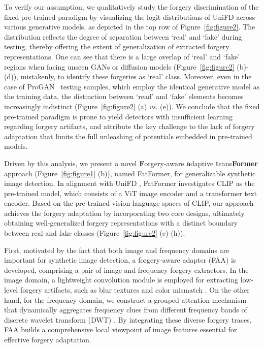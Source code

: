 \documentclass[10pt,twocolumn,letterpaper]{article}
\begin{document}
To verify our assumption, we qualitatively study the forgery discrimination of the fixed pre-trained paradigm by visualizing the logit distributions of UniFD \cite{ojha2023towards} across various generative models, as depicted in the top row of Figure~\ref{fig:figure2}.
The distribution reflects the degree of separation between `real' and `fake' during testing, thereby offering the extent of generalization of extracted forgery representations. 
One can see that there is a large overlap of `real' and `fake' regions when facing unseen GANs or diffusion models (Figure~\ref{fig:figure2} (b)-(d)), mistakenly, to identify these forgeries as `real' class. Moreover, even in the case of ProGAN~\cite{karras2018progressive} testing samples, which employ the identical generative model as the training data, the distinction between `read' and `fake' elements becomes increasingly indistinct (Figure~\ref{fig:figure2} (a) {\em vs.} (e)). 
We conclude that the fixed pre-trained paradigm is prone to yield detectors with insufficient learning regarding forgery artifacts, and attribute the key challenge to the lack of forgery adaptation that limits the full unleashing of potentials embedded in pre-trained models.

Driven by this analysis, we present a novel \textbf{F}orgery-aware \textbf{a}daptive \textbf{t}rans\textbf{Former} approach (Figure~\ref{fig:figure1} (b)), named FatFormer, for generalizable synthetic image detection.
In alignment with UniFD \cite{ojha2023towards}, FatFormer investigates CLIP \cite{radford2021learning} as the pre-trained model, which consists of a ViT \cite{dosovitskiy2020image} image encoder and a transformer \cite{vaswani2017attention} text encoder. Based on the pre-trained vision-language spaces of CLIP, our approach achieves the forgery adaptation by incorporating two core designs, ultimately obtaining well-generalized forgery representations with a distinct boundary between real and fake classes (Figure~\ref{fig:figure2} (e)-(h)).

First, motivated by the fact that both image and frequency domains are important for synthetic image detection, a forgery-aware adapter (FAA) is developed, comprising a pair of image and frequency forgery extractors. 
In the image domain, a lightweight convolution module is employed for extracting low-level forgery artifacts, such as blur textures and color mismatch \cite{li2020celeb}. 
On the other hand, for the frequency domain, we construct a grouped attention mechanism that dynamically aggregates frequency clues from different frequency bands of discrete wavelet transform (DWT) \cite{mallat1989theory}. 
By integrating these diverse forgery traces, FAA builds a comprehensive local viewpoint of image features essential for effective forgery adaptation.
\end{document}
